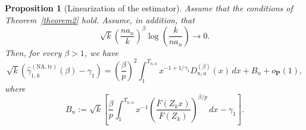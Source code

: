 \documentclass[10pt,a4paper]{amsart}
\newtheorem{proposition}{Proposition}
\begin{document}
\begin{proposition}
[Linearization of the estimator]\label{prop:linearization} Assume that the
conditions of Theorem~\ref{theorem2} hold. Assume, in addition, that
\[
\sqrt{k} \left(  \frac{na_{n}}{k}\right)  ^{\beta} \log\!\left(  \frac
{k}{na_{n}}\right)  \to0.
\]
Then, for every $\beta>1$, we have
\[
\sqrt{k}\left(  \widehat{\gamma}_{1,k}^{(\mathrm{NA,tr})}(\beta) - \gamma_{1}
\right)  = \left(  \frac{\beta}{p}\right)  ^{2} \int_{1}^{T_{n,a}}
x^{-1+1/\gamma_{1}} D_{n,a}^{(\beta)}(x)\,dx + B_{n} + o_{\mathbf{P}}(1),
\]
where
\[
B_{n} := \sqrt{k} \left[  \frac{\beta}{p} \int_{1}^{T_{n,a}} x^{-1} \left(
\frac{\overline{F}(Z_{k}x)}{\overline{F}(Z_{k})} \right)  ^{\beta/p} \,dx -
\gamma_{1} \right]  .
\]

\end{proposition}
\end{document}
